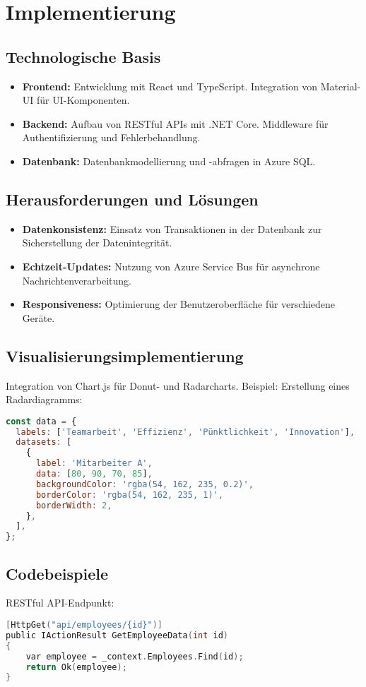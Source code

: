 \chapter{Implementierung}
\label{chap:implementierung}

\section{Technologische Basis}
\begin{itemize}
    \item \textbf{Frontend:} Entwicklung mit React und TypeScript. Integration von Material-UI für UI-Komponenten.
    \item \textbf{Backend:} Aufbau von RESTful APIs mit .NET Core. Middleware für Authentifizierung und Fehlerbehandlung.
    \item \textbf{Datenbank:} Datenbankmodellierung und -abfragen in Azure SQL.
\end{itemize}

\section{Herausforderungen und Lösungen}
\begin{itemize}
    \item \textbf{Datenkonsistenz:} Einsatz von Transaktionen in der Datenbank zur Sicherstellung der Datenintegrität.
    \item \textbf{Echtzeit-Updates:} Nutzung von Azure Service Bus für asynchrone Nachrichtenverarbeitung.
    \item \textbf{Responsiveness:} Optimierung der Benutzeroberfläche für verschiedene Geräte.
\end{itemize}

\section{Visualisierungsimplementierung}
Integration von Chart.js für Donut- und Radarcharts.  
Beispiel: Erstellung eines Radardiagramms:
\begin{lstlisting}[language=JavaScript, caption=Erstellung eines Radardiagramms]
const data = {
  labels: ['Teamarbeit', 'Effizienz', 'Pünktlichkeit', 'Innovation'],
  datasets: [
    {
      label: 'Mitarbeiter A',
      data: [80, 90, 70, 85],
      backgroundColor: 'rgba(54, 162, 235, 0.2)',
      borderColor: 'rgba(54, 162, 235, 1)',
      borderWidth: 2,
    },
  ],
};
\end{lstlisting}

\section{Codebeispiele}
RESTful API-Endpunkt:
\begin{lstlisting}[language=C, caption=RESTful API-Endpunkt]
[HttpGet("api/employees/{id}")]
public IActionResult GetEmployeeData(int id)
{
    var employee = _context.Employees.Find(id);
    return Ok(employee);
}
\end{lstlisting}